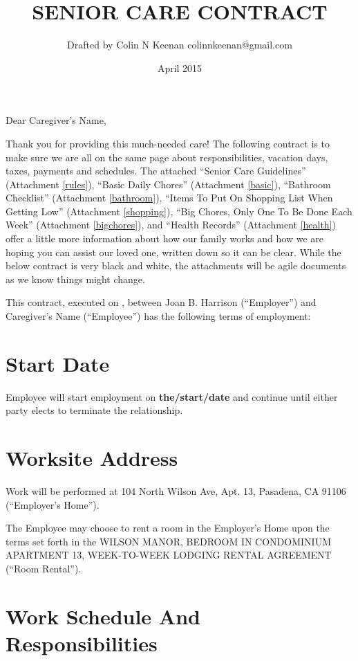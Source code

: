 \documentclass[]{article}
\newcommand{\mytitle}{SENIOR CARE CONTRACT}
\newcommand{\agreementtitle}{WILSON MANOR, BEDROOM IN CONDOMINIUM APARTMENT 13, WEEK-TO-WEEK LODGING RENTAL AGREEMENT}
\newcommand{\startdate}{the/start/date}
\newcommand{\datefillin}{\hspace{0.2cm}\makebox[3cm]{\hrulefill}}
\newcommand{\caregiver}{Caregiver's Name}
\newcommand{\mom}{Joan B. Harrison}
\newcommand{\rules}{Senior Care Guidelines}
\newcommand{\basic}{Basic Daily Chores}
\newcommand{\bathroom}{Bathroom Checklist}
\newcommand{\shopping}{Items To Put On Shopping List When Getting Low}
\newcommand{\bigchores}{Big Chores, Only One To Be Done Each Week}
\newcommand{\health}{Health Records}
\begin{document}
\title{\mytitle{}}
\author{Drafted by Colin N Keenan colinnkeenan@gmail.com}
\date{April 2015}
\maketitle
\thispagestyle{fancy}

\noindent \hrulefill

Dear \caregiver{},

Thank you for providing this much-needed care! The following contract is to make sure we are all on the same page about responsibilities, vacation days, taxes, payments and schedules. The attached ``\rules{}'' (Attachment \ref{rules}), ``\basic{}'' (Attachment \ref{basic}), ``\bathroom{}'' (Attachment \ref{bathroom}), ``\shopping{}'' (Attachment \ref{shopping}), ``\bigchores{}'' (Attachment \ref{bigchores}), and ``\health{}'' (Attachment \ref{health}) offer a little more information about how our family works and how we are hoping you can assist our loved one, written down so it can be clear. While the below contract is very black and white, the attachments will be agile documents as we know things might change.

This contract, executed on \datefillin{}, between \mom{} (``Employer'') and \caregiver{} (``Employee'') has the following terms of employment:

\section{Start Date}

Employee will start employment on \textbf{\startdate{}} and continue until either party elects to terminate the relationship.

\section{Worksite Address}

Work will be performed at 104 North Wilson Ave, Apt. 13, Pasadena, CA 91106 (``Employer's Home'').

The Employee may choose to rent a room in the Employer's Home upon the terms set forth in the \agreementtitle{} (``Room Rental'').

\section{Work Schedule And Responsibilities}
\end{document}
